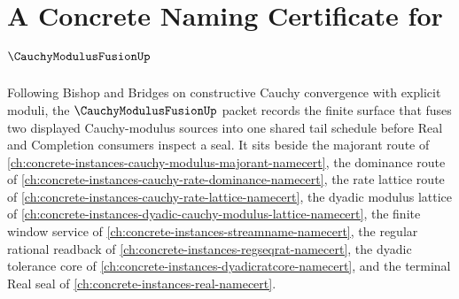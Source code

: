 \chapter{A Concrete Naming Certificate for $\CauchyModulusFusionUp$}
\label{ch:concrete-instances-cauchy-modulus-fusion-namecert}

Following Bishop and Bridges on constructive Cauchy convergence with explicit moduli, the $\CauchyModulusFusionUp$ packet records the finite surface that fuses two displayed Cauchy-modulus sources into one shared tail schedule before Real and Completion consumers inspect a seal. It sits beside the majorant route of \autoref{ch:concrete-instances-cauchy-modulus-majorant-namecert}, the dominance route of \autoref{ch:concrete-instances-cauchy-rate-dominance-namecert}, the rate lattice route of \autoref{ch:concrete-instances-cauchy-rate-lattice-namecert}, the dyadic modulus lattice of \autoref{ch:concrete-instances-dyadic-cauchy-modulus-lattice-namecert}, the finite window service of \autoref{ch:concrete-instances-streamname-namecert}, the regular rational readback of \autoref{ch:concrete-instances-regseqrat-namecert}, the dyadic tolerance core of \autoref{ch:concrete-instances-dyadicratcore-namecert}, and the terminal Real seal of \autoref{ch:concrete-instances-real-namecert}.

